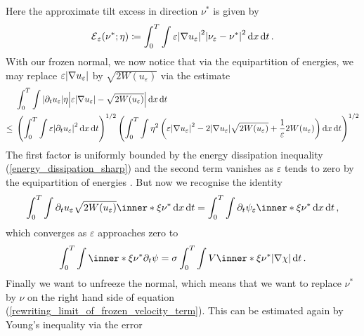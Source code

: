 Here the approximate tilt excess in direction $ \nu^{ \ast } $ is given by
\begin{equation*}
	\tilt_excess_{ \varepsilon } ( \nu^{ \ast } ; \eta )
	\coloneqq
	\int_{ 0 }^{ T }
		\int
			\varepsilon 
			\abs{ \nabla u_{ \varepsilon } }^{ 2 }
			\abs{ \nu_{ \varepsilon } - \nu^{ \ast } }^{ 2 }
		\dd{ x }
	\dd{ t }.
\end{equation*}
With our frozen normal, we now notice that via the equipartition of energies, we may replace $ \varepsilon \abs{ \nabla u_{ \varepsilon } } $ by $ \sqrt{ 2 W ( u_{ \varepsilon } ) } $ via the estimate
\begin{align*}
	& 
	\int_{ 0 }^{ T }
		\int
			\abs{ \partial_{ t } u_{ \varepsilon } } \eta
			\abs{ \varepsilon \abs{ \nabla u_{ \varepsilon } } - \sqrt{ 2 W ( u_{ \varepsilon } ) } }
		\dd{ x }
	\dd{ t }
	\\
	\leq{} &
	\left(
		\int_{ 0 }^{ T }
			\int
				\varepsilon 
				\abs{ \partial_{ t } u_{ \varepsilon } }^{ 2 }
			\dd{ x }
		\dd{ t }
	\right)^{ 1/2 }
	\left(
		\int_{ 0 }^{ T }
			\int
				\eta^{ 2 }
				\left(
					\varepsilon \abs{ \nabla u_{ \varepsilon } }^{ 2 }
					-
					2 \abs{ \nabla u_{ \varepsilon } } \sqrt{ 2 W ( u_{ \varepsilon } ) }
					+
					\frac{ 1 }{ \varepsilon }
					2 W ( u_{ \varepsilon } ) 
				\right)
			\dd{ x }
		\dd{ t }
	\right)^{ 1 / 2 }
\end{align*}
The first factor is uniformly bounded by the energy dissipation inequality (\ref{energy_dissipation_sharp}) and the second term vanishes as $ \varepsilon $ tends to zero by the equipartition of energies .
But now we recognise the identity
\begin{equation*}
	\int_{ 0 }^{ T }
		\int
			\partial_{ t } u_{ \varepsilon }
			\sqrt{ 2 W ( u_{ \varepsilon } ) }
			\inner*{ \xi }{ \nu^{ \ast } }
		\dd{ x }
	\dd{ t }
	=
	\int_{ 0 }^{ T }
		\int
			\partial_{ t } \psi_{ \varepsilon }
			\inner*{ \xi }{ \nu^{ \ast } }
		\dd{ x }
	\dd{ t },
\end{equation*}
which converges as $ \varepsilon $ approaches zero to 
\begin{equation}
	\label{rewriting_limit_of_frozen_velocity_term}
	\int_{ 0 }^{ T }
		\int
			\inner*{ \xi }{ \nu^{ \ast } }
			\partial_{ t } \psi
	=
	\sigma
	\int_{ 0 }^{ T }
		\int
			V \inner*{ \xi }{ \nu^{ \ast } }
		\abs{ \nabla \chi }
	\dd{ t }.
\end{equation}
Finally we want to unfreeze the normal, which means that we want to replace $ \nu^{ \ast } $ by $ \nu $ on the right hand side of equation (\ref{rewriting_limit_of_frozen_velocity_term}). This can be estimated again by Young's inequality via the error
